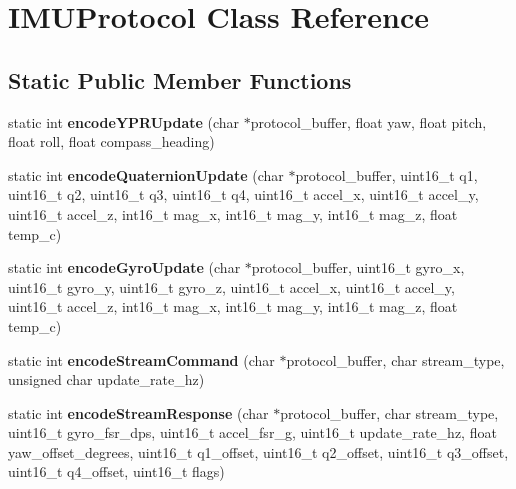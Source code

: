 \hypertarget{class_i_m_u_protocol}{}\section{I\+M\+U\+Protocol Class Reference}
\label{class_i_m_u_protocol}
\subsection*{Static Public Member Functions}
\begin{DoxyCompactItemize}
\item 
\hypertarget{class_i_m_u_protocol_a5043b90e784f5810b313489ae45fd19b}{}static int {\bfseries encode\+Y\+P\+R\+Update} (char $\ast$protocol\+\_\+buffer, float yaw, float pitch, float roll, float compass\+\_\+heading)\label{class_i_m_u_protocol_a5043b90e784f5810b313489ae45fd19b}

\item 
\hypertarget{class_i_m_u_protocol_a2076e198a0111d24e7312302529c11fa}{}static int {\bfseries encode\+Quaternion\+Update} (char $\ast$protocol\+\_\+buffer, uint16\+\_\+t q1, uint16\+\_\+t q2, uint16\+\_\+t q3, uint16\+\_\+t q4, uint16\+\_\+t accel\+\_\+x, uint16\+\_\+t accel\+\_\+y, uint16\+\_\+t accel\+\_\+z, int16\+\_\+t mag\+\_\+x, int16\+\_\+t mag\+\_\+y, int16\+\_\+t mag\+\_\+z, float temp\+\_\+c)\label{class_i_m_u_protocol_a2076e198a0111d24e7312302529c11fa}

\item 
\hypertarget{class_i_m_u_protocol_a2ae8e5f0bfe45485ab475335fad6e889}{}static int {\bfseries encode\+Gyro\+Update} (char $\ast$protocol\+\_\+buffer, uint16\+\_\+t gyro\+\_\+x, uint16\+\_\+t gyro\+\_\+y, uint16\+\_\+t gyro\+\_\+z, uint16\+\_\+t accel\+\_\+x, uint16\+\_\+t accel\+\_\+y, uint16\+\_\+t accel\+\_\+z, int16\+\_\+t mag\+\_\+x, int16\+\_\+t mag\+\_\+y, int16\+\_\+t mag\+\_\+z, float temp\+\_\+c)\label{class_i_m_u_protocol_a2ae8e5f0bfe45485ab475335fad6e889}

\item 
\hypertarget{class_i_m_u_protocol_a900c9f6e4174c510765f8885f07bd0e9}{}static int {\bfseries encode\+Stream\+Command} (char $\ast$protocol\+\_\+buffer, char stream\+\_\+type, unsigned char update\+\_\+rate\+\_\+hz)\label{class_i_m_u_protocol_a900c9f6e4174c510765f8885f07bd0e9}

\item 
\hypertarget{class_i_m_u_protocol_a47edf8d27c46da8cb395c14a726a9732}{}static int {\bfseries encode\+Stream\+Response} (char $\ast$protocol\+\_\+buffer, char stream\+\_\+type, uint16\+\_\+t gyro\+\_\+fsr\+\_\+dps, uint16\+\_\+t accel\+\_\+fsr\+\_\+g, uint16\+\_\+t update\+\_\+rate\+\_\+hz, float yaw\+\_\+offset\+\_\+degrees, uint16\+\_\+t q1\+\_\+offset, uint16\+\_\+t q2\+\_\+offset, uint16\+\_\+t q3\+\_\+offset, uint16\+\_\+t q4\+\_\+offset, uint16\+\_\+t flags)\label{class_i_m_u_protocol_a47edf8d27c46da8cb395c14a726a9732}


\end{DoxyCompactItemize}
